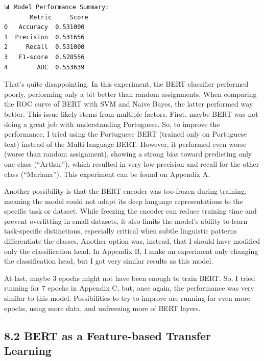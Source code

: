 \documentclass[11pt]{article}
\begin{document}
    \begin{Verbatim}[commandchars=\\\{\}]
📊 Model Performance Summary:
       Metric     Score
0   Accuracy  0.531000
1  Precision  0.531656
2     Recall  0.531000
3   F1-score  0.528556
4        AUC  0.553639
    \end{Verbatim}

    That's quite disappointing. In this experiment, the BERT classifier
performed poorly, performing only a bit better than random assignments.
When comparing the ROC curve of BERT with SVM and Naive Bayes, the
latter performed way better. This issue likely stems from multiple
factors. First, maybe BERT was not doing a great job with understanding
Portuguese. So, to improve the performance, I tried using the Portuguese
BERT (trained only on Portuguese text) instead of the Multi-language
BERT. However, it performed even worse (worse than random assignment),
showing a strong bias toward predicting only one class (``Arthur''),
which resulted in very low precision and recall for the other class
(``Mariana''). This experiment can be found on Appendix A.

Another possibility is that the BERT encoder was too frozen during
training, meaning the model could not adapt its deep language
representations to the specific task or dataset. While freezing the
encoder can reduce training time and prevent overfitting in small
datasets, it also limits the model's ability to learn task-specific
distinctions, especially critical when subtle linguistic patterns
differentiate the classes. Another option was, instead, that I should
have modified only the classification head. In Appendix B, I make an
experiment only changing the classification head, but I got very similar
results as this model.

At last, maybe 3 epochs might not have been enough to train BERT. So, I
tried running for 7 epochs in Appendix C, but, once again, the
performance was very similar to this model. Possibilities to try to
improve are running for even more epochs, using more data, and
unfreezing more of BERT layers.

\subsection{8.2 BERT as a Feature-based Transfer
Learning}\label{bert-as-a-feature-based-transfer-learning}
\end{document}
